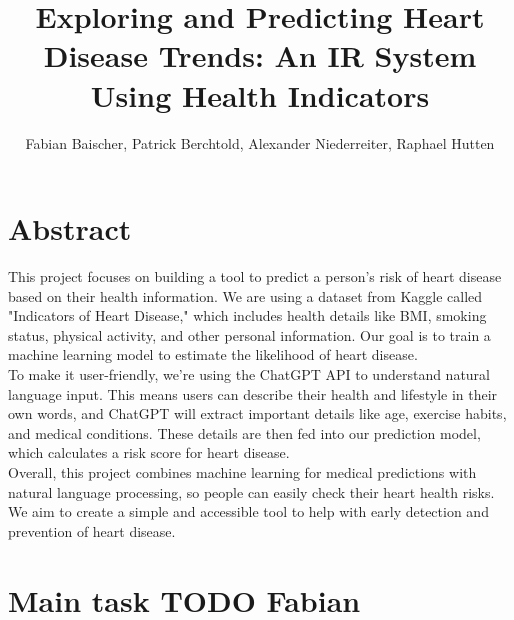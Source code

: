 \documentclass{article}
\title{Exploring and Predicting Heart Disease Trends: An IR System Using  Health Indicators}
\author{Fabian Baischer, Patrick Berchtold, Alexander Niederreiter, Raphael Hutten}
\begin{document}
\maketitle


\section{Abstract}

This project focuses on building a tool to predict a person’s risk of heart disease based on their health information.
We are using a dataset from Kaggle called "Indicators of Heart Disease,"
which includes health details like BMI, smoking status, physical activity, and other personal information.
Our goal is to train a machine learning model to estimate the likelihood of heart disease.\\
To make it user-friendly, we’re using the ChatGPT API to understand natural language input.
This means users can describe their health and lifestyle in their own words,
and ChatGPT will extract important details like age, exercise habits, and medical conditions.
These details are then fed into our prediction model, which calculates a risk score for heart disease.\\
Overall, this project combines machine learning for medical predictions with natural language processing,
so people can easily check their heart health risks.
We aim to create a simple and accessible tool to help with early detection and prevention of heart disease.


\section{Main task TODO Fabian}
\end{document}
